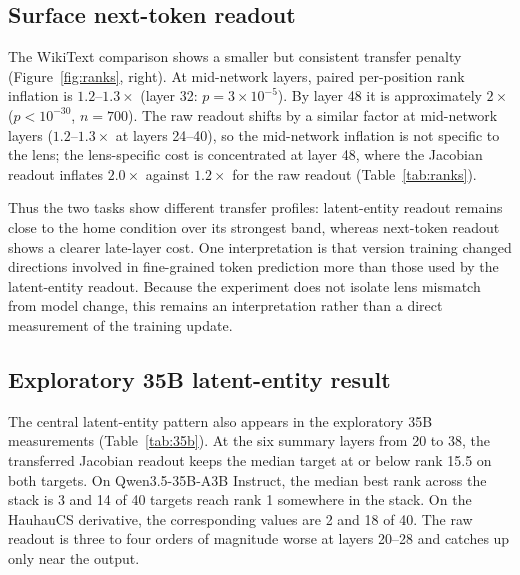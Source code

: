 \documentclass[10pt,a4paper,twocolumn]{article}
\begin{document}
\subsection{Surface next-token readout}

The WikiText comparison shows a smaller but consistent transfer penalty
(Figure~\ref{fig:ranks}, right). At mid-network layers, paired per-position
rank inflation is $1.2$--$1.3\times$ (layer 32:
$p=3\times10^{-5}$). By layer 48 it is approximately $2\times$
($p<10^{-30}$, $n{=}700$). The raw readout shifts by a similar factor at mid-network layers ($1.2$--$1.3\times$ at layers 24--40), so the mid-network inflation is not specific to the lens; the lens-specific cost is concentrated at layer 48, where the Jacobian readout inflates $2.0\times$ against $1.2\times$ for the raw readout (Table~\ref{tab:ranks}).

Thus the two tasks show different transfer profiles: latent-entity readout
remains close to the home condition over its strongest band, whereas
next-token readout shows a clearer late-layer cost. One interpretation is
that version training changed directions involved in fine-grained token
prediction more than those used by the latent-entity readout. Because the
experiment does not isolate lens mismatch from model change, this remains an
interpretation rather than a direct measurement of the training update.

\subsection{Exploratory 35B latent-entity result}
\label{sec:35b-results}

The central latent-entity pattern also appears in the exploratory 35B
measurements (Table~\ref{tab:35b}). At the six summary layers from 20 to 38, the
transferred Jacobian readout keeps the median target at or below rank 15.5 on
both targets. On Qwen3.5-35B-A3B Instruct, the median best rank across the
stack is 3 and 14 of 40 targets reach rank 1 somewhere in the stack. On the
HauhauCS derivative, the corresponding values are 2 and 18 of 40. The raw
readout is three to four orders of magnitude worse at layers 20--28 and
catches up only near the output.
\end{document}
